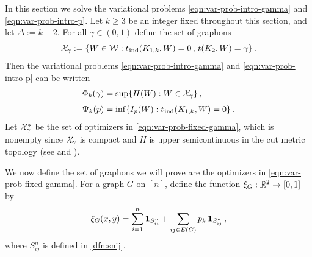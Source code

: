 In this section we solve the variational problems \eqref{eqn:var-prob-intro-gamma} and \eqref{eqn:var-prob-intro-p}. Let $k\geq3$ be an integer fixed throughout this section, and let $\Delta:=k-2$. For all $\gamma\in(0,1)$ define the set of graphons
$${\mathcal X}_\gamma:=\{W\in{\mathcal W}:t_{\hspace{0.2mm}\mathrm{ind}}(K_{1,k},W)=0\,,\,t(K_2,W)=\gamma\}\,.$$
Then the variational problems \eqref{eqn:var-prob-intro-gamma} and \eqref{eqn:var-prob-intro-p} can be written
\begin{align}
\Phi_k(\gamma) &= \sup\{H(W):W\in{\mathcal X}_\gamma\} \,,\label{eqn:var-prob-fixed-gamma} \\[4pt]
\Psi_k(p) &= \inf\{I_p(W):t_{\hspace{0.2mm}\mathrm{ind}}(K_{1,k},W)=0\} \,.
\end{align}
Let ${\mathcal X}_\gamma^\ast$ be the set of optimizers in \eqref{eqn:var-prob-fixed-gamma}, which is nonempty since ${\mathcal X}_\gamma$ is compact and $H$ is upper semicontinuous in the cut metric topology (see \cite[Theorem~3.7]{borgs2008convergent} and \cite[Lemma~2.1]{chatterjee2011large}).

We now define the set of graphons we will prove are the optimizers in \eqref{eqn:var-prob-fixed-gamma}.
For a graph $G$ on $[n]$, define the function $\xi_G:{\mathbb R}^2\to[0,1]$ by
\begin{equation}\label{eqn:xiG-dfn}
\xi_G(x,y)=\sum_{i=1}^n\boldsymbol{1}_{S^n_{ii}}+\sum_{ij\in E(G)}p_k\,\boldsymbol{1}_{S_{ij}^n}\,,
\end{equation}
where $S_{ij}^n$ is defined in \eqref{dfn:snij}.

